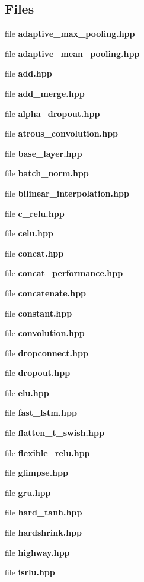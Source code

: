 \subsection*{Files}
\begin{DoxyCompactItemize}
\item 
file \textbf{ adaptive\+\_\+max\+\_\+pooling.\+hpp}
\item 
file \textbf{ adaptive\+\_\+mean\+\_\+pooling.\+hpp}
\item 
file \textbf{ add.\+hpp}
\item 
file \textbf{ add\+\_\+merge.\+hpp}
\item 
file \textbf{ alpha\+\_\+dropout.\+hpp}
\item 
file \textbf{ atrous\+\_\+convolution.\+hpp}
\item 
file \textbf{ base\+\_\+layer.\+hpp}
\item 
file \textbf{ batch\+\_\+norm.\+hpp}
\item 
file \textbf{ bilinear\+\_\+interpolation.\+hpp}
\item 
file \textbf{ c\+\_\+relu.\+hpp}
\item 
file \textbf{ celu.\+hpp}
\item 
file \textbf{ concat.\+hpp}
\item 
file \textbf{ concat\+\_\+performance.\+hpp}
\item 
file \textbf{ concatenate.\+hpp}
\item 
file \textbf{ constant.\+hpp}
\item 
file \textbf{ convolution.\+hpp}
\item 
file \textbf{ dropconnect.\+hpp}
\item 
file \textbf{ dropout.\+hpp}
\item 
file \textbf{ elu.\+hpp}
\item 
file \textbf{ fast\+\_\+lstm.\+hpp}
\item 
file \textbf{ flatten\+\_\+t\+\_\+swish.\+hpp}
\item 
file \textbf{ flexible\+\_\+relu.\+hpp}
\item 
file \textbf{ glimpse.\+hpp}
\item 
file \textbf{ gru.\+hpp}
\item 
file \textbf{ hard\+\_\+tanh.\+hpp}
\item 
file \textbf{ hardshrink.\+hpp}
\item 
file \textbf{ highway.\+hpp}
\item 
file \textbf{ isrlu.\+hpp}
\item 

\end{DoxyCompactItemize}
